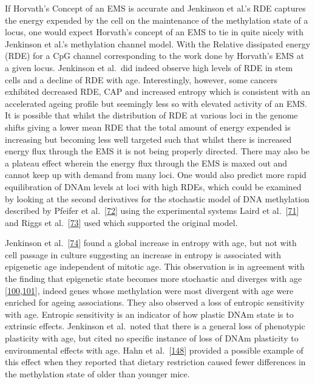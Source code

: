 \documentclass[
]{book}
\begin{document}
If Horvath's Concept of an EMS is accurate and Jenkinson et al.'s RDE captures the energy expended by the cell on the maintenance of the methylation state of a locus, one would expect Horvath's concept of an EMS to tie in quite nicely with Jenkinson et al.'s methylation channel model.
With the Relative dissipated energy (RDE) for a CpG channel corresponding to the work done by Horvath's EMS at a given locus.
Jenkinson et al.~did indeed observe high levels of RDE in stem cells and a decline of RDE with age.
Interestingly, however, some cancers exhibited decreased RDE, CAP and increased entropy which is consistent with an accelerated ageing profile but seemingly less so with elevated activity of an EMS.
It is possible that whilst the distribution of RDE at various loci in the genome shifts giving a lower mean RDE that the total amount of energy expended is increasing but becoming less well targeted such that whilst there is increased energy flux through the EMS it is not being properly directed.
There may also be a plateau effect wherein the energy flux through the EMS is maxed out and cannot keep up with demand from many loci.
One would also predict more rapid equilibration of DNAm levels at loci with high RDEs, which could be examined by looking at the second derivatives for the stochastic model of DNA methylation described by Pfeifer et al.~{[}\protect\hyperlink{ref-Pfeifer1990a}{72}{]} using the experimental systems Laird et al.~{[}\protect\hyperlink{ref-Laird2004}{71}{]} and Riggs et al.~{[}\protect\hyperlink{ref-Riggs2004a}{73}{]} used which supported the original model.

Jenkinson et al.~{[}\protect\hyperlink{ref-Jenkinson2017}{74}{]} found a global increase in entropy with age, but not with cell passage in culture suggesting an increase in entropy is associated with epigenetic age independent of mitotic age.
This observation is in agreement with the finding that epigenetic state becomes more stochastic and diverges with age {[}\protect\hyperlink{ref-Fraga2005}{100},\protect\hyperlink{ref-Slieker2016}{101}{]}, indeed genes whose methylation were most divergent with age were enriched for ageing associations.
They also observed a loss of entropic sensitivity with age.
Entropic sensitivity is an indicator of how plastic DNAm state is to extrinsic effects.
Jenkinson et al.~noted that there is a general loss of phenotypic plasticity with age, but cited no specific instance of loss of DNAm plasticity to environmental effects with age.
Hahn et al.~{[}\protect\hyperlink{ref-Hahn2017}{148}{]} provided a possible example of this effect when they reported that dietary restriction caused fewer differences in the methylation state of older than younger mice.
\end{document}
